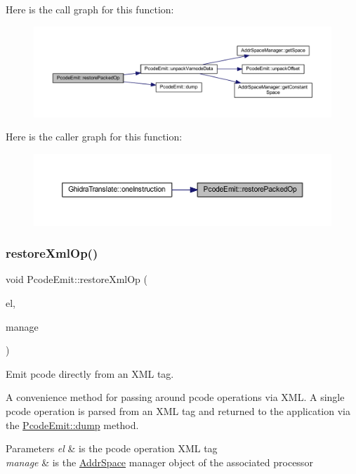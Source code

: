 Here is the call graph for this function\+:
\nopagebreak
\begin{figure}[H]
\begin{center}
\leavevmode
\includegraphics[width=350pt]{class_pcode_emit_a8136f8c678e250f77907ed57dc6956ac_cgraph}
\end{center}
\end{figure}
Here is the caller graph for this function\+:
\nopagebreak
\begin{figure}[H]
\begin{center}
\leavevmode
\includegraphics[width=350pt]{class_pcode_emit_a8136f8c678e250f77907ed57dc6956ac_icgraph}
\end{center}
\end{figure}
\mbox{\label{class_pcode_emit_a7e440d43aba89c358ffcab1f2d88b3db}} 
\subsubsection{\texorpdfstring{restoreXmlOp()}{restoreXmlOp()}}
{\footnotesize\ttfamily void Pcode\+Emit\+::restore\+Xml\+Op (\begin{DoxyParamCaption}\item[{const \mbox{\hyperlink{class_element}{Element}} $\ast$}]{el,  }\item[{const \mbox{\hyperlink{class_addr_space_manager}{Addr\+Space\+Manager}} $\ast$}]{manage }\end{DoxyParamCaption})}



Emit pcode directly from an X\+ML tag. 

A convenience method for passing around pcode operations via X\+ML. A single pcode operation is parsed from an X\+ML tag and returned to the application via the \mbox{\hyperlink{class_pcode_emit_a00f25999bbdea677b82577b21bdfff8e}{Pcode\+Emit\+::dump}} method. 
\begin{DoxyParams}{Parameters}
{\em el} & is the pcode operation X\+ML tag \\
\hline
{\em manage} & is the \mbox{\hyperlink{class_addr_space}{Addr\+Space}} manager object of the associated processor \\
\hline
\end{DoxyParams}



